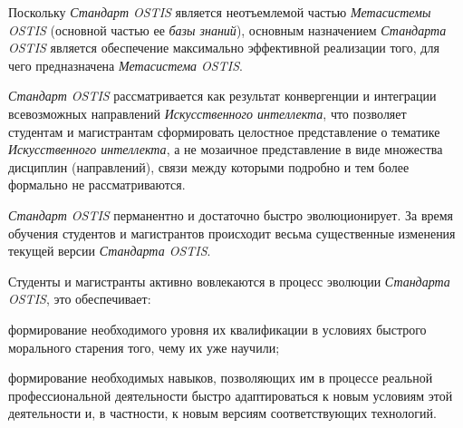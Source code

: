 Поскольку \textit{Стандарт OSTIS} является неотъемлемой частью \textit{Метасистемы OSTIS} (основной частью ее \textit{базы знаний}), основным назначением \textit{Стандарта OSTIS} является обеспечение максимально эффективной реализации того, для чего предназначена \textit{Метасистема OSTIS}.

\textit{Стандарт OSTIS} рассматривается как результат конвергенции и интеграции всевозможных направлений \textit{Искусственного интеллекта}, что позволяет студентам и магистрантам сформировать целостное представление о тематике \textit{Искусственного интеллекта}, а не мозаичное представление в виде множества дисциплин (направлений), связи между которыми подробно и тем более формально не рассматриваются.

\textit{Стандарт OSTIS} перманентно и достаточно быстро эволюционирует. За время обучения студентов и магистрантов происходит весьма существенные изменения текущей версии \textit{Стандарта OSTIS}.

Студенты и магистранты активно вовлекаются в процесс эволюции \textit{Стандарта OSTIS}, это обеспечивает:

\begin{textitemize}
	\item формирование необходимого уровня их квалификации в условиях быстрого морального старения того, чему их уже научили;
	\item формирование необходимых навыков, позволяющих им в процессе реальной профессиональной деятельности быстро адаптироваться к новым условиям этой деятельности и, в частности, к новым версиям соответствующих технологий.
\end{textitemize}

